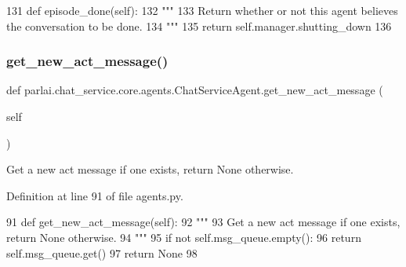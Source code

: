 \begin{DoxyCode}
131     \textcolor{keyword}{def }episode\_done(self):
132         \textcolor{stringliteral}{"""}
133 \textcolor{stringliteral}{        Return whether or not this agent believes the conversation to be done.}
134 \textcolor{stringliteral}{        """}
135         \textcolor{keywordflow}{return} self.manager.shutting\_down
136 \end{DoxyCode}
\mbox{\label{classparlai_1_1chat__service_1_1core_1_1agents_1_1ChatServiceAgent_ac1fbe6b38906f3d52fb49dd682086866}} 
\subsubsection{\texorpdfstring{get\+\_\+new\+\_\+act\+\_\+message()}{get\_new\_act\_message()}}
{\footnotesize\ttfamily def parlai.\+chat\+\_\+service.\+core.\+agents.\+Chat\+Service\+Agent.\+get\+\_\+new\+\_\+act\+\_\+message (\begin{DoxyParamCaption}\item[{}]{self }\end{DoxyParamCaption})}

\begin{DoxyVerb}Get a new act message if one exists, return None otherwise.
\end{DoxyVerb}
 

Definition at line 91 of file agents.\+py.


\begin{DoxyCode}
91     \textcolor{keyword}{def }get\_new\_act\_message(self):
92         \textcolor{stringliteral}{"""}
93 \textcolor{stringliteral}{        Get a new act message if one exists, return None otherwise.}
94 \textcolor{stringliteral}{        """}
95         \textcolor{keywordflow}{if} \textcolor{keywordflow}{not} self.msg\_queue.empty():
96             \textcolor{keywordflow}{return} self.msg\_queue.get()
97         \textcolor{keywordflow}{return} \textcolor{keywordtype}{None}
98 
\end{DoxyCode}
\mbox{\label{classparlai_1_1chat__service_1_1core_1_1agents_1_1ChatServiceAgent_a4b7ec3cb69f7e3f00b160f8474c344cc}} 
